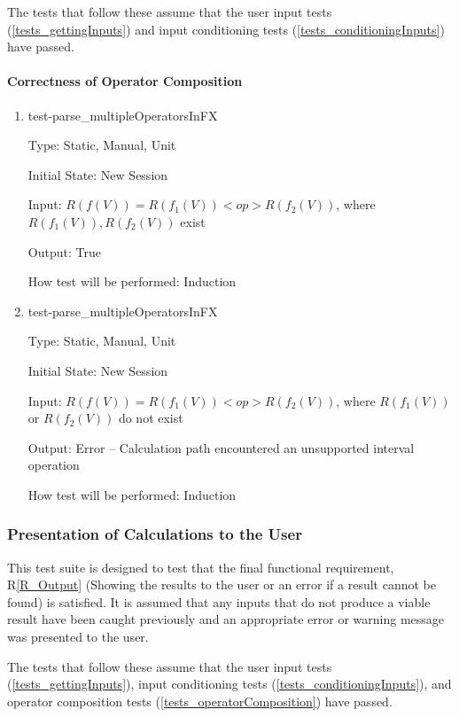 \documentclass[12pt, titlepage]{article}
\newcommand{\rref}[1]{R\ref{#1}}
\begin{document}
The tests that follow these assume that the user input tests 
(\ref{tests_gettingInputs}) and input conditioning tests 
(\ref{tests_conditioningInputs}) have passed.

\paragraph{Correctness of Operator Composition}

\begin{enumerate}
	
	\item{test-parse\_multipleOperatorsInFX}
	
	Type: Static, Manual, Unit
	
	Initial State: New Session
	
	Input: $R(f(V)) = R(f_1(V)) <op> R(f_2(V))$, where $R(f_1(V)), R(f_2(V))$ 
	exist
	
	Output: True
	
	How test will be performed: Induction\\
	
	\item{test-parse\_multipleOperatorsInFX}
	
	Type: Static, Manual, Unit
	
	Initial State: New Session
	
	Input: $R(f(V)) = R(f_1(V)) <op> R(f_2(V))$, where $R(f_1(V))$ or 
	$R(f_2(V))$ do not exist
	
	Output: Error -- Calculation path encountered an unsupported interval 
	operation
	
	How test will be performed: Induction\\
	
\end{enumerate}

\subsubsection{Presentation of Calculations to the User}
\label{tests_outputResults}
This test suite is designed to test that the final functional requirement, 
\rref{R_Output} (Showing the results to the user or an error if a result cannot 
be found) is satisfied. It is assumed that any inputs that do not produce a 
viable result have been caught previously and an appropriate error or warning 
message was presented to the user.

The tests that follow these assume that the user input tests 
(\ref{tests_gettingInputs}), input conditioning tests 
(\ref{tests_conditioningInputs}), and operator composition tests 
(\ref{tests_operatorComposition}) have passed.
\end{document}
